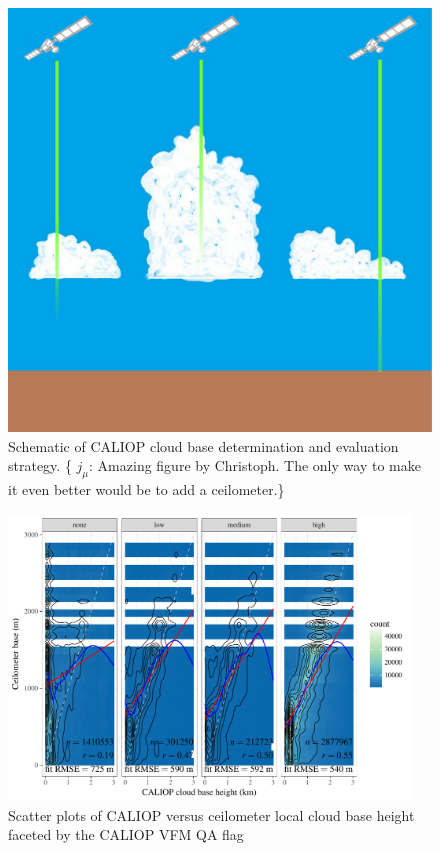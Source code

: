 \documentclass[amt,manuscript]{copernicus}\usepackage[]{graphicx}\usepackage[]{color}
\newcommand{\hlnum}[1]{\textcolor[rgb]{0.686,0.059,0.569}{#1}}%
\newenvironment{knitrout}{}{} %
\newcommand\comment[2]{\{\hlnum{ \textit{#1}: #2}\}}
\newcommand\commentjm[1]{\comment{$j_\mu$}{#1}}
\begin{document}
\begin{figure}
  \centering
  \includegraphics[width=0.5\linewidth,keepaspectratio=true]{CloudFieldCALIOP.pdf}
  \caption{Schematic of CALIOP cloud base determination and evaluation strategy.
    \commentjm{Amazing figure by Christoph.  The only way to make it even better
      would be to add a ceilometer.}}
  \label{fig:method}
\end{figure}

\begin{figure}
  \centering
\begin{knitrout}
\color{fgcolor}

{\centering \includegraphics[width=0.95\textwidth]{figure/method-eval-qual-1} 

}



\end{knitrout}
  \caption{Scatter plots of CALIOP versus ceilometer local cloud base height
    faceted by the CALIOP VFM QA flag}
  \label{fig:quality-qa}
\end{figure}
\end{document}
